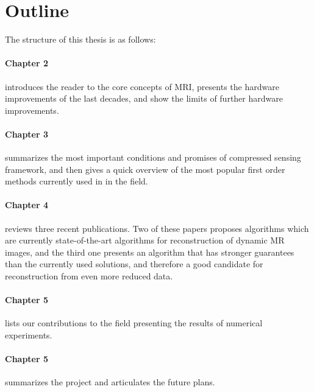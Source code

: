 \section{Outline}
The structure of this thesis is as follows:

\paragraph{Chapter 2} introduces the reader to the core concepts of MRI, presents the hardware improvements of the last decades, and show the limits of further hardware improvements.

\paragraph{Chapter 3} summarizes the most important conditions and promises of compressed sensing framework, and then gives a quick overview of the most popular first order methods currently used in in the field.

\paragraph{Chapter 4} reviews three recent publications. Two of these papers proposes algorithms which are currently state-of-the-art algorithms for reconstruction of dynamic MR images, and the third one presents an algorithm that has stronger guarantees than the currently used solutions, and therefore a good candidate for reconstruction from even more reduced data.

\paragraph{Chapter 5} lists our contributions to the field presenting the results of numerical experiments.

\paragraph{Chapter 5} summarizes the project and articulates the future plans.

\clearpage %
